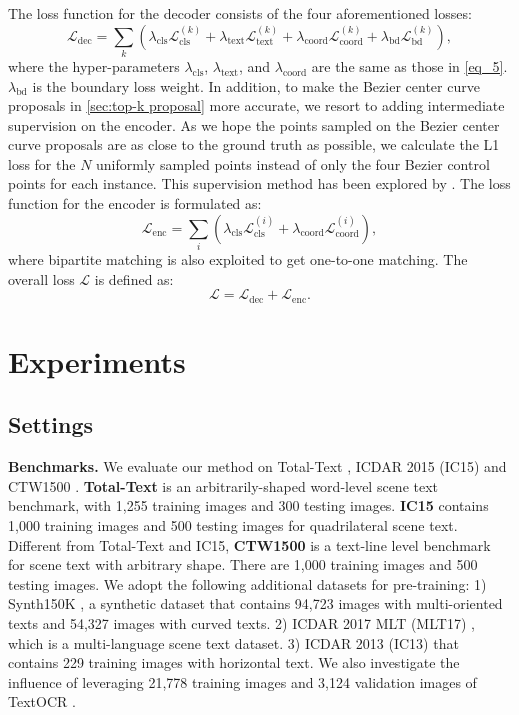 \documentclass[10pt,twocolumn,letterpaper]{article}
\begin{document}
The loss function for the decoder consists of the four aforementioned losses:
\begin{equation}
    \mathcal{L}_{\text{dec}} = \sum_{k} \left( \lambda_{\text{cls}} \mathcal{L}_{\text{cls}}^{(k)}  + \lambda_{\text{text}} \mathcal{L}_{\text{text}}^{(k)} + \lambda_{\text{coord}} \mathcal{L}_{\text{coord}}^{(k)} + \lambda_{\text{bd}} \mathcal{L}_{\text{bd}}^{(k)}\right),
\end{equation}
where the hyper-parameters $\lambda_{\text{cls}}$, $\lambda_{\text{text}}$, and $\lambda_{\text{coord}}$ are the same as those in \cref{eq_5}. $\lambda_{\text{bd}}$ is the boundary loss weight. In addition, to make the Bezier center curve proposals in \cref{sec:top-k proposal} more accurate, we resort to adding intermediate supervision on the encoder. As we hope the points sampled on the Bezier center curve proposals are as close to the ground truth as possible, we calculate the L1 loss for the $N$ uniformly sampled points instead of only the four Bezier control points for each instance. This supervision method has been explored by \cite{feng2022rethinking}. The loss function for the encoder is formulated as:
\begin{equation}
    \mathcal{L}_{\text{enc}} = \sum_{i} \left( \lambda_{\text{cls}} \mathcal{L}_{\text{cls}}^{(i)}  + \lambda_{\text{coord}} \mathcal{L}_{\text{coord}}^{(i)}\right),
\end{equation}
where bipartite matching is also exploited to get one-to-one matching. The overall loss $\mathcal{L}$ is defined as:
\begin{equation}
    \mathcal{L} = \mathcal{L}_{\text{dec}} + \mathcal{L}_{\text{enc}}.
\end{equation}


\section{Experiments}
\subsection{Settings}
\noindent \textbf{Benchmarks.} We evaluate our method on Total-Text \cite{ch2020total}, ICDAR 2015 (IC15) \cite{karatzas2015icdar} and CTW1500 \cite{liu2019curved}. \textbf{Total-Text} is an arbitrarily-shaped word-level scene text benchmark, with 1,255 training images and 300 testing images. \textbf{IC15} contains 1,000 training images and 500 testing images for quadrilateral scene text. Different from Total-Text and IC15, \textbf{CTW1500} is a text-line level benchmark for scene text with arbitrary shape. There are 1,000 training images and 500 testing images. We adopt the following additional datasets for pre-training: 1) Synth150K \cite{liu2020abcnet}, a synthetic dataset that contains 94,723 images with multi-oriented texts and 54,327 images with curved texts. 2) ICDAR 2017 MLT (MLT17) \cite{nayef2017icdar2017}, which is a multi-language scene text dataset. 3) ICDAR 2013 (IC13) \cite{karatzas2013icdar} that contains 229 training images with horizontal text. We also investigate the influence of leveraging 21,778 training images and 3,124 validation images of TextOCR \cite{singh2021textocr}.
\end{document}
